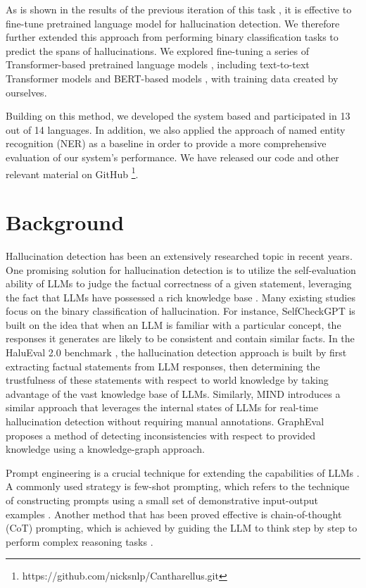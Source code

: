 \documentclass[11pt]{article}
\begin{document}
As is shown in the results of the previous iteration of this task \cite{mickus2024semeval}, it is effective to fine-tune pretrained language model for hallucination detection. We therefore further extended this approach from performing binary classification tasks to predict the spans of hallucinations. We explored fine-tuning a series of Transformer-based pretrained language models \cite{vaswani2017attention}, including text-to-text Transformer models \cite{raffel2020exploring} and BERT-based models \cite{devlin2018bert}, with training data created by ourselves. 

Building on this method, we developed the system based and participated in 13 out of 14 languages. In addition, we also applied the approach of named entity recognition (NER) as a baseline in order to provide a more comprehensive evaluation of our system's performance. We have released our code and other relevant material on GitHub \footnote{https://github.com/nicksnlp/Cantharellus.git}.


\section{Background}
Hallucination detection has been an extensively researched topic in recent years. One promising solution for hallucination detection is to utilize the self-evaluation ability of LLMs to judge the factual correctness of a given statement, leveraging the fact that LLMs have possessed a rich knowledge base \cite{li2024dawn, zhang2024self}. Many existing studies focus on the binary classification of hallucination. For instance, SelfCheckGPT \cite{manakul2023selfcheckgpt} is built on the idea that when an LLM is familiar with a particular concept, the responses it generates are likely to be consistent and contain similar facts. In the HaluEval 2.0 benchmark \cite{li2024dawn}, the hallucination detection approach is built by first extracting factual statements from LLM responses, then determining the trustfulness of these statements with respect to world knowledge by taking advantage of the vast knowledge base of LLMs. Similarly, MIND \cite{su2024unsupervised} introduces a similar approach that leverages the internal states of LLMs for real-time hallucination detection without requiring manual annotations. GraphEval \cite{sansford2024grapheval} proposes a method of detecting inconsistencies with respect to provided knowledge using a knowledge-graph approach.

Prompt engineering is a crucial technique for extending the capabilities of LLMs \cite{sahoo2024systematic}. A commonly used strategy is few-shot prompting, which refers to the technique of constructing prompts using a small set of demonstrative input-output examples \cite{lazaridou2022internet, ma2023fairness}. Another method that has been proved effective is chain-of-thought (CoT) prompting, which is achieved by guiding the LLM to think step by step to perform complex reasoning tasks \cite{wei2022chain, zhang2022automatic, chen2023you}.
\end{document}
